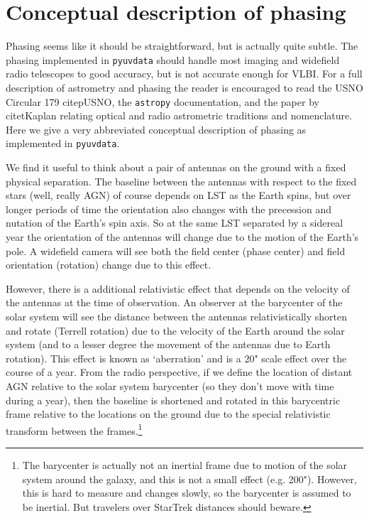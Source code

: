 \documentclass[11pt, oneside]{article}   	%
\begin{document}
\section{Conceptual description of phasing}

Phasing seems like it should be straightforward, but is actually quite subtle. The phasing implemented in \texttt{pyuvdata} should handle most imaging and widefield radio telescopes to good accuracy, but is not accurate enough for VLBI. For a full description of astrometry and phasing the reader is encouraged to read the USNO Circular 179 citep{USNO}, the \texttt{astropy} documentation, and the paper by citet{Kaplan} relating optical and radio astrometric traditions and nomenclature. Here we give a very abbreviated conceptual description of phasing as implemented in \texttt{pyuvdata}.

We find it useful to think about a pair of antennas on the ground with a fixed physical separation. The baseline between the antennas with respect to the fixed stars (well, really AGN) of course depends on LST as the Earth spins, but over longer periods of time the orientation also changes with the precession and nutation of the Earth's spin axis. So at the same LST separated by a sidereal year the orientation of the antennas will change due to the motion of the Earth's pole. A widefield camera will see both the field center (phase center) and field orientation (rotation) change due to this effect.

However, there is a additional relativistic effect that depends on the velocity of the antennas at the time of observation. An observer at the barycenter of the solar system will see the distance between the antennas relativistically shorten and rotate (Terrell rotation) due to the velocity of the Earth around the solar system (and to a lesser degree the movement of the antennas due to Earth rotation). This effect is known as `aberration' and is a 20" scale effect over the course of a year. From the radio perspective, if we define the location of distant AGN relative to the solar system barycenter (so they don't move with time during a year), then the baseline is shortened and rotated in this barycentric frame relative to the locations on the ground due to the special relativistic transform between the frames.\footnote{The barycenter is actually not an inertial frame due to motion of the solar system around the galaxy, and this is not a small effect (e.g. 200"). However, this is hard to measure and changes slowly, so the barycenter is assumed to be inertial. But travelers over StarTrek distances should beware.} 
\end{document}
